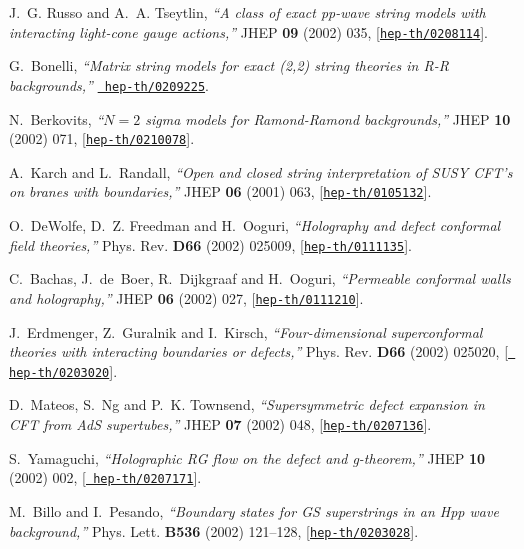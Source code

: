 \documentclass[a4paper,12pt]{article}
\numberwithin{equation}{section}
\begin{document}
\begin{thebibliography}{10}
J.~G. Russo and A.~A. Tseytlin, {\it ``A class of exact pp-wave string models
  with interacting light-cone gauge actions,''}  JHEP {\bf 09} (2002) 035,
  [\href{http://arXiv.org/abs/hep-th/0208114}{{\tt hep-th/0208114}}].

G.~Bonelli, {\it ``Matrix string models for exact (2,2) string theories in
  {R-R} backgrounds,''}  \href{http://arXiv.org/abs/hep-th/0209225}{{\tt
  hep-th/0209225}}.

N.~Berkovits, {\it ``{$N = 2$} sigma models for {R}amond-{R}amond
  backgrounds,''}  JHEP {\bf 10} (2002) 071,
  [\href{http://arXiv.org/abs/hep-th/0210078}{{\tt hep-th/0210078}}].

A.~Karch and L.~Randall, {\it ``Open and closed string interpretation of {SUSY}
  {CFT}'s on branes with boundaries,''}  JHEP {\bf 06} (2001) 063,
  [\href{http://arXiv.org/abs/hep-th/0105132}{{\tt hep-th/0105132}}].

O.~DeWolfe, D.~Z. Freedman and H.~Ooguri, {\it ``Holography and defect
  conformal field theories,''}  Phys. Rev. {\bf D66} (2002) 025009,
  [\href{http://arXiv.org/abs/hep-th/0111135}{{\tt hep-th/0111135}}].

C.~Bachas, J.~de~Boer, R.~Dijkgraaf and H.~Ooguri, {\it ``Permeable conformal
  walls and holography,''}  JHEP {\bf 06} (2002) 027,
  [\href{http://arXiv.org/abs/hep-th/0111210}{{\tt hep-th/0111210}}].

J.~Erdmenger, Z.~Guralnik and I.~Kirsch, {\it ``Four-dimensional superconformal
  theories with interacting boundaries or defects,''}  Phys. Rev. {\bf D66}
  (2002) 025020, [\href{http://arXiv.org/abs/hep-th/0203020}{{\tt
  hep-th/0203020}}].

D.~Mateos, S.~Ng and P.~K. Townsend, {\it ``Supersymmetric defect expansion in
  {CFT} from {AdS} supertubes,''}  JHEP {\bf 07} (2002) 048,
  [\href{http://arXiv.org/abs/hep-th/0207136}{{\tt hep-th/0207136}}].

S.~Yamaguchi, {\it ``Holographic {RG} flow on the defect and g-theorem,''}
  JHEP {\bf 10} (2002) 002, [\href{http://arXiv.org/abs/hep-th/0207171}{{\tt
  hep-th/0207171}}].

M.~Billo and I.~Pesando, {\it ``Boundary states for {GS} superstrings in an
  {H}pp wave background,''}  Phys. Lett. {\bf B536} (2002) 121--128,
  [\href{http://arXiv.org/abs/hep-th/0203028}{{\tt hep-th/0203028}}].


\end{thebibliography}
\end{document}

